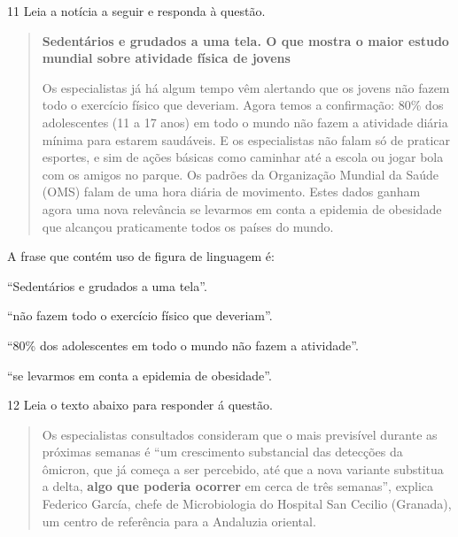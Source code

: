 \num{11} Leia a notícia a seguir e responda à questão.

\begin{quote}

\textbf{Sedentários e grudados a uma tela. O
que mostra o maior estudo mundial sobre atividade física de
jovens}

Os especialistas já há algum tempo vêm alertando que os jovens não fazem todo o exercício físico que deveriam. Agora temos a confirmação: 80\% dos adolescentes (11 a 17 anos) em todo o mundo não fazem a atividade diária mínima para estarem saudáveis. E os especialistas não falam só de praticar esportes, e sim de ações básicas como caminhar até a escola ou jogar bola com os amigos no parque. Os padrões da Organização Mundial da Saúde (OMS) falam de uma hora diária de movimento. Estes dados ganham agora uma nova relevância se levarmos em conta a epidemia de obesidade que alcançou praticamente todos os países do mundo.

\end{quote}


A frase que contém uso de figura de linguagem é:

\begin{escolha}
    
    \item ``Sedentários e grudados a uma tela''.
    
    \item ``não fazem todo o exercício físico que deveriam''.
    
    \item ``80\% dos adolescentes em todo o mundo não fazem a atividade''.
    
    \item ``se levarmos em conta a epidemia de obesidade''.

\end{escolha}

\num{12} Leia o texto abaixo para responder á questão.

\begin{quote}

Os especialistas consultados consideram que o mais previsível durante as
próximas semanas é ``um crescimento substancial das detecções da
ômicron, que já começa a ser percebido, até que a nova variante
substitua a delta, \textbf{algo que poderia ocorrer} em cerca de três
semanas'', explica Federico García, chefe de Microbiologia do Hospital
San Cecilio (Granada), um centro de referência para a Andaluzia
oriental.

\end{quote}

